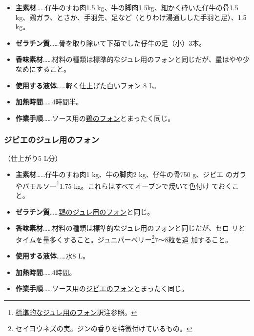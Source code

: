 \begin{recette}
\begin{itemize}
\item
  \textbf{主素材}\ldots{}\ldots{}仔牛のすね肉1.5
  kg、牛の脚肉1.5kg、細かく砕いた仔牛の骨1.5
  kg、鶏ガラ、とさか、手羽先、足など（とりわけ湯通しした手羽と足）、1.5
  kg。
\item
  \textbf{ゼラチン質}\ldots{}\ldots{}骨を取り除いて下茹でした仔牛の足（小）3本。
\item
  \textbf{香味素材}\ldots{}\ldots{}材料の種類は標準的なジュレ用のフォンと同じだが、量はやや少なめにすること。
\item
  \textbf{使用する液体}\ldots{}\ldots{}軽く仕上げた\protect\hyperlink{fonds-blanc}{白いフォン}
  8 L。
\item
  \textbf{加熱時間}\ldots{}\ldots{}4時間半。
\item
  \textbf{作業手順}\ldots{}\ldots{}ソース用の\protect\hyperlink{fonds-de-volaille}{鶏のフォン}とまったく同じ。
\end{itemize}

\maeaki

\hypertarget{fonds-pour-gelee-de-gibier}{%
\subsubsection{ジビエのジュレ用のフォン}\label{fonds-pour-gelee-de-gibier}}



（仕上がり5 L分）

\begin{itemize}
\item
  \textbf{主素材}\ldots{}\ldots{}仔牛のすね肉1 kg、牛の脚肉2
  kg、仔牛の骨750 g、ジビエ のガラやバモルソー\footnote{\protect\hyperlink{fonds-pour-gelee-ordinaire}{標準的なジュレ用のフォン}訳注参照。}1.75
  kg。これらはすべてオーブンで焼いて色付け ておくこと。
\item
  \textbf{ゼラチン質}\ldots{}\ldots{}\protect\hyperlink{fonds-pour-gelee-de-volaille}{鶏のジュレ用のフォン}と同じ。
\item
  \textbf{香味素材}\ldots{}\ldots{}材料の種類は標準的なジュレ用のフォンと同じだが、セロ
  リとタイムを\untiers{}量多くすること。ジュニパーベリー\footnote{セイヨウネズの実。ジンの香りを特徴付けているもの。}7〜8粒を追
  加すること。
\item
  \textbf{使用する液体}\ldots{}\ldots{}水8 L。
\item
  \textbf{加熱時間}\ldots{}\ldots{}4時間。
\item
  \textbf{作業手順}\ldots{}\ldots{}ソース用の\protect\hyperlink{fonds-de-gibier}{ジビエのフォン}とまったく同じ。
\end{itemize}


\end{recette}
